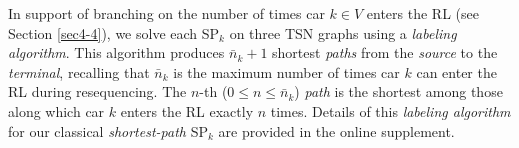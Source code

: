 \documentclass[12pt]{article}
\begin{document}


In support of branching on the number of times car $k\in V$ enters the RL (see Section \ref{sec4-4}), we solve each SP$_k$ on three TSN graphs using a \textit{labeling algorithm}. This algorithm produces $\bar{n}_k+1$ shortest \textit{paths} from the \textit{source} to the \textit{terminal}, recalling that $\bar{n}_k$ is the maximum number of times car $k$ can enter the RL during resequencing. The $n$-th ($0\leqslant n\leqslant\bar{n}_k$) \textit{path} is the shortest among those along which car $k$ enters the RL exactly $n$ times. Details of this \textit{labeling algorithm} for our classical \textit{shortest-path} SP$_k$ are provided in the online supplement.



\end{document}
